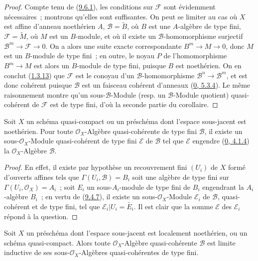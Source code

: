 \begin{proof}
Compte tenu de (\hyperref[I.9.6.1-fr]{9.6.1}), les conditions sur
$\mathscr{F}$ sont évidemment nécessaires~; montrons qu'elles sont
suffisantes. On peut se limiter au cas où $X$ est affine d'anneau
noethérien $A$, $\mathscr{B}=\widetilde{B}$, où $B$ est une $A$-algèbre de
type fini, $\mathscr{F}=\widetilde{M}$, où $M$ est un $B$-module, et où il
existe un $\mathscr{B}$-homomorphisme surjectif
$\mathscr{B}^m\to\mathscr{F}\to 0$. On a alors une suite exacte
correspondante $B^m\to M\to 0$, donc $M$ est un $B$-module de type fini~;
en outre, le noyau $P$ de l'homomorphisme $B^m\to M$ est alors un
$B$-module de type fini, puisque $B$ est noethérien. On en conclut
(\hyperref[I.1.3.13-fr]{1.3.13}) que $\mathscr{F}$ est le conoyau d'un
$\mathscr{B}$-homomorphisme $\mathscr{B}^n\to\mathscr{B}^m$, et est donc
cohérent puisque $\mathscr{B}$ est un faisceau cohérent d'anneaux
(\hyperref[0.5.3.4-fr]{0, 5.3.4}). Le même raisonnement montre qu'un
sous-$\mathscr{B}$-Module (resp. un $\mathscr{B}$-Module quotient)
quasi-cohérent de $\mathscr{F}$ est de type fini, d'où la seconde partie du
corollaire.
\end{proof}

\begin{proposition}[9.6.5]
\label{I.9.6.5-fr}
Soit $X$ un schéma quasi-compact ou un préschéma dont l'espace sous-jacent
est noethérien. Pour toute $\mathscr{O}_X$-Algèbre quasi-cohérente de type
fini $\mathscr{B}$, il existe un sous-$\mathscr{O}_X$-Module quasi-cohérent
de type fini $\mathscr{E}$ de $\mathscr{B}$ tel que $\mathscr{E}$ engendre
(\hyperref[0.4.1.4-fr]{0, 4.1.4}) la $\mathscr{O}_X$-Algèbre
$\mathscr{B}$.
\end{proposition}

\begin{proof}
En effet, il existe par hypothèse un recouvrement fini $(U_i)$ de $X$ formé
d'ouverts affines tels que $\Gamma(U_i,\mathscr{B})=B_i$ soit une algèbre
de type fini sur $\Gamma(U_i,\mathscr{O}_X)=A_i$~; soit $E_i$ un
sous-$A_i$-module de type fini de $B_i$ engendrant la $A_i$-algèbre $B_i$~;
en vertu de (\hyperref[I.9.4.7-fr]{9.4.7}), il existe un
sous-$\mathscr{O}_X$-Module $\mathscr{E}_i$ de $\mathscr{B}$,
quasi-cohérent et de type fini, tel que
$\mathscr{E}_i|U_i=\widetilde{E_i}$. Il est clair que la somme
$\mathscr{E}$ des $\mathscr{E}_i$ répond à la question.
\end{proof}

\begin{proposition}[9.6.6]
\label{I.9.6.6-fr}
Soit $X$ un préschéma dont l'espace sous-jacent est localement noethérien,
ou un schéma quasi-compact. Alors toute $\mathscr{O}_X$-Algèbre
quasi-cohérente $\mathscr{B}$ est limite inductive de ses
sous-$\mathscr{O}_X$-Algèbres quasi-cohérentes de type fini.
\end{proposition}

